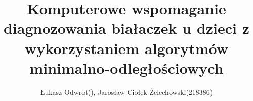 \documentclass[comsoc]{IEEEtran}
\begin{document}
	\title{Komputerowe wspomaganie diagnozowania białaczek u dzieci z wykorzystaniem algorytmów minimalno-odległościowych}
	\author{Łukasz Odwrot(), Jarosław Ciołek-Żelechowski(218386)}
	\maketitle

\graphicspath{ {img/} }














\end{document}
